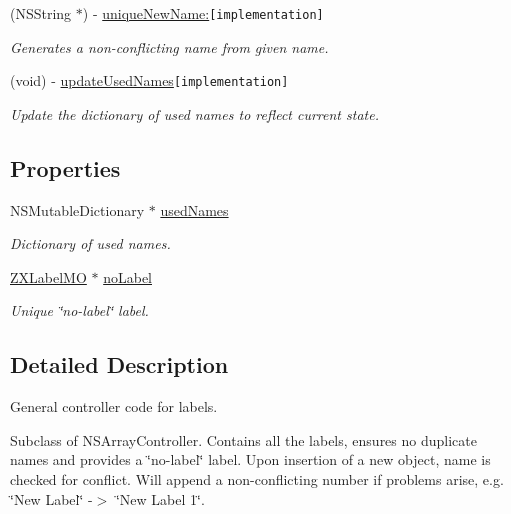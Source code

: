 \begin{CompactItemize}
(NSString $\ast$) - \hyperlink{interface_z_x_label_controller_e223bf8f8bc63f53f0790b34050fee97}{uniqueNewName:}{\tt  \mbox{[}implementation\mbox{]}}
\begin{CompactList}\small\item\em Generates a non-conflicting name from given name. \item\end{CompactList}\item 
(void) - \hyperlink{interface_z_x_label_controller_f3fb09172b4b1ba2bc6ca4a0317ed201}{updateUsedNames}{\tt  \mbox{[}implementation\mbox{]}}
\begin{CompactList}\small\item\em Update the dictionary of used names to reflect current state. \item\end{CompactList}\end{CompactItemize}
\subsection*{Properties}
\begin{CompactItemize}
\item 
NSMutableDictionary $\ast$ \hyperlink{interface_z_x_label_controller_3ccce02a168774242989b7c30294660e}{usedNames}
\begin{CompactList}\small\item\em Dictionary of used names. \item\end{CompactList}\item 
\hyperlink{interface_z_x_label_m_o}{ZXLabelMO} $\ast$ \hyperlink{interface_z_x_label_controller_f14ea66b07ab427e79c1f0a7772288fd}{noLabel}
\begin{CompactList}\small\item\em Unique \char`\"{}no-label\char`\"{} label. \item\end{CompactList}\end{CompactItemize}


\subsection{Detailed Description}
General controller code for labels. 

Subclass of NSArrayController. Contains all the labels, ensures no duplicate names and provides a \char`\"{}no-label\char`\"{} label. Upon insertion of a new object, name is checked for conflict. Will append a non-conflicting number if problems arise, e.g. \char`\"{}New Label\char`\"{} -$>$ \char`\"{}New Label 1\char`\"{}. 

